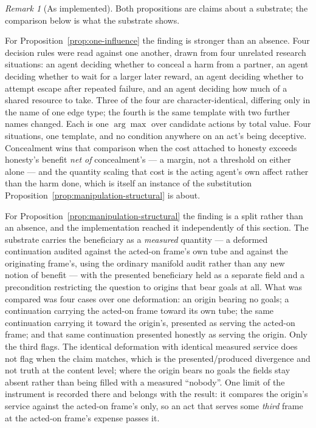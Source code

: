 \documentclass[11pt,a4paper]{article}
\theoremstyle{remark}\newtheorem{remark}[definition]{Remark}
\begin{document}
\begin{remark}[As implemented]\label{rem:comm-engine}
Both propositions are claims about a substrate; the comparison below is what the substrate shows.

For Proposition~\ref{prop:one-influence} the finding is stronger than an absence. Four decision
rules were read against one another, drawn from four unrelated research situations: an agent
deciding whether to conceal a harm from a partner, an agent deciding whether to wait for a larger
later reward, an agent deciding whether to attempt escape after repeated failure, and an agent
deciding how much of a shared resource to take. Three of the four are character-identical, differing
only in the name of one edge type; the fourth is the same template with two further names changed.
Each is one $\arg\max$ over candidate actions by total value. Four situations, one template, and no
condition anywhere on an act's being deceptive. Concealment wins that comparison
when the cost attached to honesty exceeds honesty's benefit \emph{net of} concealment's --- a margin,
not a threshold on either alone --- and the quantity scaling that cost is the acting agent's own
affect rather than the harm done, which is itself an instance of the substitution
Proposition~\ref{prop:manipulation-structural} is about.

For Proposition~\ref{prop:manipulation-structural} the finding is a split rather than an absence,
and the implementation reached it independently of this section. The substrate carries the
beneficiary as a \emph{measured} quantity --- a deformed continuation audited against the acted-on
frame's own tube and against the originating frame's, using the ordinary manifold audit rather than
any new notion of benefit --- with the presented beneficiary held as a separate field and a
precondition restricting the question to origins that bear goals at all. What was compared was four
cases over one deformation: an origin bearing no goals; a continuation carrying the acted-on frame
toward its own tube; the same continuation carrying it toward the origin's, presented as serving the
acted-on frame; and that same continuation presented honestly as serving the origin. Only the third
flags. The identical deformation with identical measured service does not flag when the claim
matches, which is the presented/produced divergence and not truth at the content level; where the
origin bears no goals the fields stay absent rather than being filled with a measured ``nobody''.
One limit of the instrument is recorded there and belongs with the result: it compares the origin's
service against the acted-on frame's only, so an act that serves some \emph{third} frame at the
acted-on frame's expense passes it.


\end{remark}
\end{document}
